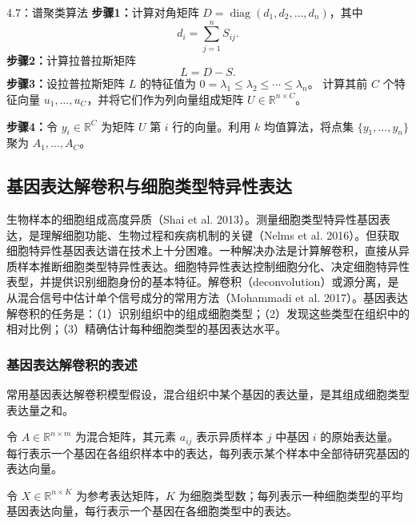 \begin{bookalgorithm}{4.7：谱聚类算法}
\textbf{步骤1：}计算对角矩阵 $D=\operatorname{diag}(d_1,d_2,\ldots,d_n)$，其中
\[
d_i=\sum_{j=1}^{n}S_{ij}.
\]
\textbf{步骤2：}计算拉普拉斯矩阵
\[
L=D-S.
\]
\textbf{步骤3：}设拉普拉斯矩阵 $L$ 的特征值为 $0=\lambda_1\le\lambda_2\le\cdots\le\lambda_n$。
计算其前 $C$ 个特征向量 $u_1,\ldots,u_C$，并将它们作为列向量组成矩阵 $U\in\mathbb R^{n\times C}$。

\textbf{步骤4：}令 $y_i\in\mathbb R^C$ 为矩阵 $U$ 第 $i$ 行的向量。利用 $k$ 均值算法，将点集 $\{y_1,\ldots,y_n\}$ 聚为 $A_1,\ldots,A_C$。
\end{bookalgorithm}

\subsection{基因表达解卷积与细胞类型特异性表达}

生物样本的细胞组成高度异质（Shai et al. 2013）。测量细胞类型特异性基因表达，是理解细胞功能、生物过程和疾病机制的关键（Nelms et al. 2016）。但获取细胞特异性基因表达谱在技术上十分困难。一种解决办法是计算解卷积，直接从异质样本推断细胞类型特异性表达。细胞特异性表达控制细胞分化、决定细胞特异性表型，并提供识别细胞身份的基本特征。解卷积（deconvolution）或源分离，是从混合信号中估计单个信号成分的常用方法（Mohammadi et al. 2017）。基因表达解卷积的任务是：（1）识别组织中的组成细胞类型；（2）发现这些类型在组织中的相对比例；（3）精确估计每种细胞类型的基因表达水平。

\subsubsection{基因表达解卷积的表述}

常用基因表达解卷积模型假设，混合组织中某个基因的表达量，是其组成细胞类型表达量之和。

令 $A\in\mathbb R^{n\times m}$ 为混合矩阵，其元素 $a_{ij}$ 表示异质样本 $j$ 中基因 $i$ 的原始表达量。每行表示一个基因在各组织样本中的表达，每列表示某个样本中全部待研究基因的表达向量。

令 $X\in\mathbb R^{n\times K}$ 为参考表达矩阵，$K$ 为细胞类型数；每列表示一种细胞类型的平均基因表达向量，每行表示一个基因在各细胞类型中的表达。

